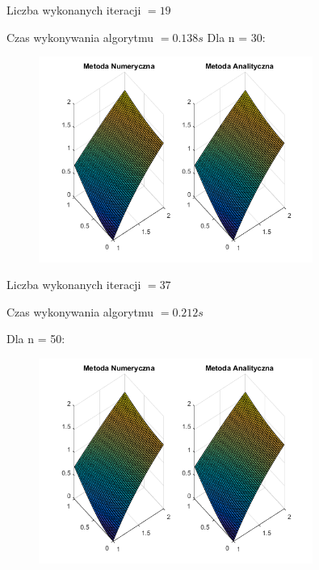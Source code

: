 Liczba wykonanych iteracji $ = 19 $

Czas wykonywania algorytmu $ = 0.138 s$
\newpage
Dla n = 30:

\begin{figure}[!ht]
	\begin{center}
		\includegraphics[width=0.8\textwidth]{Lab6/charts/pr/zad1/30.png}
	\end{center}
\end{figure}

Liczba wykonanych iteracji $ = 37 $

Czas wykonywania algorytmu $ = 0.212 s$



Dla n = 50:

\begin{figure}[!ht]
	\begin{center}
		\includegraphics[width=0.8\textwidth]{Lab6/charts/pr/zad1/50.png}
	\end{center}
\end{figure}

